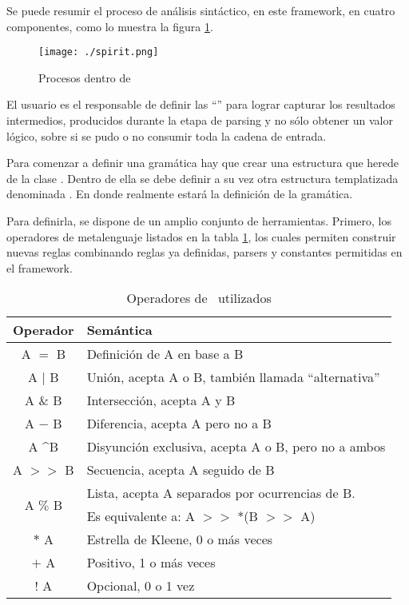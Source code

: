 Se puede resumir el proceso de análisis sintáctico, en este framework, en cuatro componentes, como lo muestra la figura \ref{fig:procesoSpirit}.

\begin{figure}\centering
\texttt{[image: ./spirit.png]}
\caption{Procesos dentro de \spirit}\label{fig:procesoSpirit}
\end{figure}

El usuario es el responsable de definir las ``'' para lograr capturar los resultados intermedios, producidos durante la etapa de parsing y no sólo obtener un valor lógico, sobre si se pudo o no consumir toda la cadena de entrada.

Para comenzar a definir una gramática hay que crear una estructura que herede de la clase . Dentro de ella se debe definir a su vez otra estructura templatizada denominada . En donde realmente estará la definición de la gramática.

Para definirla, se dispone de un amplio conjunto de herramientas. Primero, los operadores de metalenguaje listados en la tabla \ref{ope_spirit}, los cuales permiten construir nuevas reglas combinando reglas ya definidas, parsers y constantes permitidas en el framework.

\begin{table}[!ht]\centering
\begin{tabular}{| c | l |}
\hline

\rowcolor{gris} \textbf{Operador} & \textbf{Semántica} \\ \hline

A $=$                  B  & Definición de A en base a B \\ \hline
A $|$                  B  & Unión, acepta A o B, también llamada ``alternativa''\\ \hline
A $\&$                 B  & Intersección, acepta A y B \\ \hline
A $-$                  B  & Diferencia, acepta A pero no a B  \\ \hline
A \textasciicircum     B  & Disyunción exclusiva, acepta A o B, pero no a ambos \\ \hline
A $>>$                 B  & Secuencia, acepta A seguido de B \\ \hline
\multirow{2}{*}{A $\%$ B} & Lista, acepta A separados por ocurrencias de B.\\
                          & Es equivalente a: A $>>$ *(B $>>$ A)\\ \hline
$*$                    A  & Estrella de Kleene, 0 o más veces \\ \hline
$+$                    A  & Positivo, 1 o más veces \\ \hline
$!$                    A  & Opcional, 0 o 1 vez \\ \hline
\end{tabular}
\caption{Operadores de \spirit\ utilizados}\label{ope_spirit}
\end{table}


